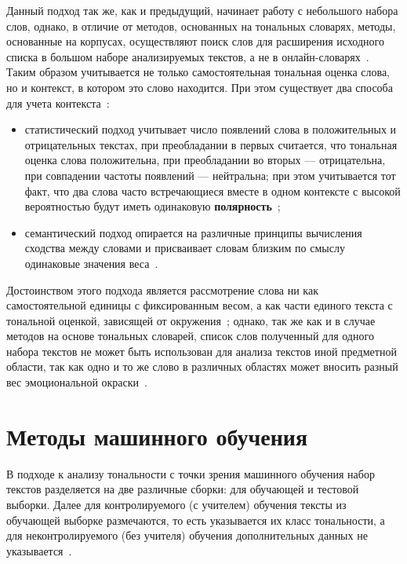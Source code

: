 Данный подход так же, как и предыдущий, начинает работу с небольшого набора
слов, однако, в отличие от методов, основанных на тональных словарях, методы,
основанные на корпусах, осуществляют поиск слов для расширения исходного списка
в большом наборе анализируемых текстов, а не в онлайн-словарях~\cite{article2}.
Таким образом учитывается не только самостоятельная тональная оценка слова, но и
контекст, в котором это слово находится. При этом существует
два способа для учета контекста~\cite{article16}:
\begin{itemize}
    \item статистический подход учитывает число появлений слова в положительных
        и отрицательных текстах, при преобладании в первых считается, что
        тональная оценка слова положительна, при преобладании во вторых ---
        отрицательна, при совпадении частоты появлений --- нейтральна; при этом
        учитывается тот факт, что два слова часто встречающиеся вместе в одном
        контексте с высокой вероятностью будут иметь одинаковую
        \textbf{полярность}~\cite{article20};
    \item семантический подход опирается на различные принципы вычисления
        сходства между словами и присваивает словам близким по смыслу одинаковые
        значения веса~\cite{article20}.
\end{itemize}

Достоинством этого подхода является рассмотрение слова ни как самостоятельной
единицы с фиксированным весом, а как части единого текста с тональной оценкой,
зависящей от окружения~\cite{article2}; однако, так же как и в случае методов
на основе тональных словарей, список слов полученный для одного набора текстов
не может быть использован для анализа текстов иной предметной области, так как
одно и то же слово в различных областях может вносить разный вес эмоциональной
окраски~\cite{article05}.


\section{Методы машинного обучения}

В подходе к анализу тональности с точки зрения машинного обучения набор
текстов разделяется на две различные сборки: для обучающей и тестовой выборки.
Далее для контролируемого (с учителем) обучения тексты из обучающей
выборке размечаются, то есть указывается их класс тональности, а для
неконтролируемого (без учителя) обучения дополнительных данных не
указывается~\cite{article18}.

